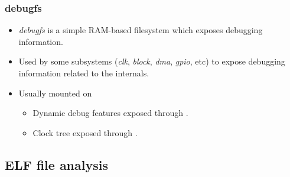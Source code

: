 \begin{frame}
  \frametitle{debugfs}
  \begin{itemize}
    \item {\em debugfs} is a simple RAM-based filesystem which exposes debugging
          information.
    \item Used by some subsystems ({\em clk}, {\em block}, {\em dma}, {\em gpio},
          etc) to expose debugging information related to the internals.
    \item Usually mounted on 
    \begin{itemize}
      \item Dynamic debug features exposed through .
      \item Clock tree exposed through .
    \end{itemize}
  \end{itemize}
\end{frame}

\subsection{ELF file analysis}

